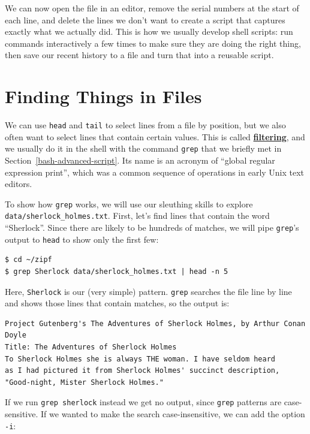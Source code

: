 \documentclass[
]{krantz}
\newcommand{\gref}[2]{\hyperlink{#2}{\textbf{#1}}}
\begin{document}
We can now open the file in an editor,
remove the serial numbers at the start of each line,
and delete the lines we don't want
to create a script that captures exactly what we actually did.
This is how we usually develop shell scripts:
run commands interactively a few times to make sure they are doing the right thing,
then save our recent history to a file and turn that into a reusable script.

\hypertarget{bash-advanced-grep}{%
\section{Finding Things in Files}\label{bash-advanced-grep}}

We can use \texttt{head} and \texttt{tail} to select lines from a file by position,
but we also often want to select lines that contain certain values.
This is called \gref{filtering}{filter},
and we usually do it in the shell with the command \texttt{grep}
that we briefly met in Section~\ref{bash-advanced-script}.
Its name is an acronym of ``global regular expression print'',
which was a common sequence of operations in early Unix text editors.

To show how \texttt{grep} works,
we will use our sleuthing skills to explore \texttt{data/sherlock\_holmes.txt}.
First,
let's find lines that contain the word ``Sherlock''.
Since there are likely to be hundreds of matches,
we will pipe \texttt{grep}'s output to \texttt{head} to show only the first few:

\begin{verbatim}
$ cd ~/zipf
$ grep Sherlock data/sherlock_holmes.txt | head -n 5
\end{verbatim}

Here, \texttt{Sherlock} is our (very simple) pattern.
\texttt{grep} searches the file line by line
and shows those lines that contain matches,
so the output is:

\begin{verbatim}
Project Gutenberg's The Adventures of Sherlock Holmes, by Arthur Conan Doyle
Title: The Adventures of Sherlock Holmes
To Sherlock Holmes she is always THE woman. I have seldom heard
as I had pictured it from Sherlock Holmes' succinct description,
"Good-night, Mister Sherlock Holmes."
\end{verbatim}

If we run \texttt{grep\ sherlock} instead we get no output,
since \texttt{grep} patterns are case-sensitive.
If we wanted to make the search case-insensitive,
we can add the option \texttt{-i}:
\end{document}
